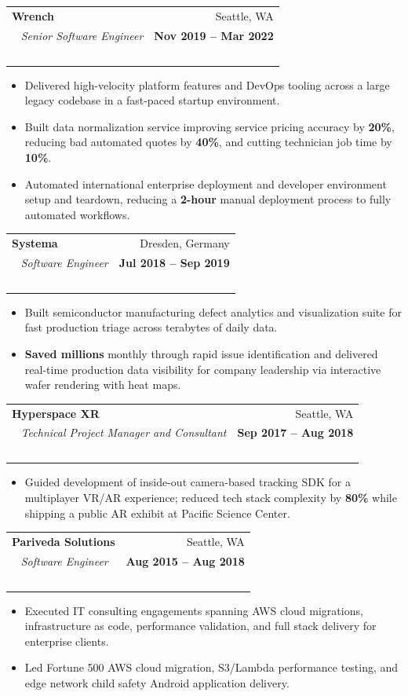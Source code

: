 \documentclass[10pt,letterpaper]{article}
\makeatletter
\newcommand{\jobblock}[4]{%
  \vspace{0.55em}
  \noindent
  \begin{tabularx}{\textwidth}{@{}X r@{}}  %
    {\bfseries\color{ink}#1} & {\color{muted}\small #2} \\\  %
    {\color{accent}\itshape #3} & {\color{muted}\small\bfseries #4} \\\  %
  \end{tabularx}
  \vspace{0.15em}
}
\makeatother
\begin{document}
\jobblock{Wrench}{Seattle, WA}{Senior Software Engineer}{Nov 2019 -- Mar 2022}
\begin{itemize}
  \item Delivered high-velocity platform features and DevOps tooling across a large
    legacy codebase in a fast-paced startup environment.
  \item Built data normalization service improving service pricing accuracy by \textbf{20\%},
    reducing bad automated quotes by \textbf{40\%}, and cutting technician job time by
    \textbf{10\%}.
  \item Automated international enterprise deployment and developer environment setup
    and teardown, reducing a \textbf{2-hour} manual deployment process to fully automated
    workflows.
\end{itemize}

\jobblock{Systema}{Dresden, Germany}{Software Engineer}{Jul 2018 -- Sep 2019}
\begin{itemize}
  \item Built semiconductor manufacturing defect analytics and visualization suite for
    fast production triage across terabytes of daily data.
  \item \textbf{Saved millions} monthly through rapid issue identification and delivered real-time
    production data visibility for company leadership via interactive wafer rendering
    with heat maps.
\end{itemize}

\jobblock{Hyperspace XR}{Seattle, WA}{Technical Project Manager and Consultant}{Sep 2017 -- Aug 2018}
\begin{itemize}
  \item Guided development of inside-out camera-based tracking SDK for a multiplayer VR/AR
    experience; reduced tech stack complexity by \textbf{80\%} while shipping a public AR
    exhibit at Pacific Science Center.
\end{itemize}

\jobblock{Pariveda Solutions}{Seattle, WA}{Software Engineer}{Aug 2015 -- Aug 2018}
\begin{itemize}
  \item Executed IT consulting engagements spanning AWS cloud migrations, infrastructure
    as code, performance validation, and full stack delivery for enterprise clients.
  \item Led Fortune 500 AWS cloud migration, S3/Lambda performance testing, and edge
    network child safety Android application delivery.
\end{itemize}
\end{document}
